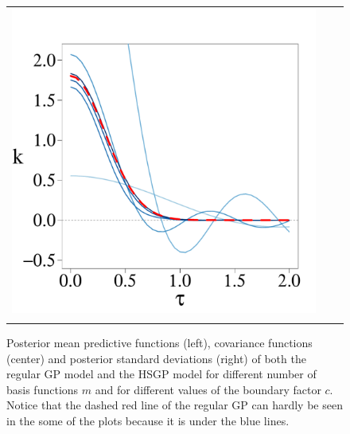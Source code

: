 \documentclass[onecolumn,a4paper,11pt]{article}
\begin{document}
\begin{figure}
\begin{tabular}{ c c c }
\includegraphics[scale=0.215, trim = 0mm 4mm 5mm 14mm, clip]{ch5_fig3_Cov_part6.pdf} &\\
\arrayrulecolor{darkgray}\hline
\end{tabular}
\caption{Posterior mean predictive functions (left), covariance functions (center) and posterior standard deviations (right) of both the regular GP model and the HSGP model for different number of basis functions $m$ and for different values of the boundary factor $c$. Notice that the dashed red line of the regular GP can hardly be seen in the some of the plots because it is under the blue lines.}
  \label{fig3_Post_part1}
\end{figure}
\end{document}
